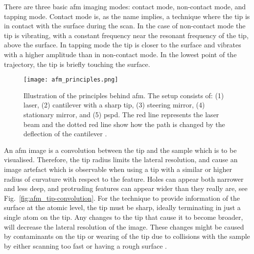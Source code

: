


There are three basic \ac{afm} imaging modes: contact mode, non-contact mode, and tapping mode. Contact mode is, as the name implies, a technique where the tip is in contact with the surface during the scan. In the case of non-contact mode the tip is vibrating, with a constant frequency near the resonant frequency of the tip, above the surface. In tapping mode the tip is closer to the surface and vibrates with a higher amplitude than in non-contact mode. In the lowest point of the trajectory, the tip is briefly touching the surface.

\begin{figure}[htbp]
    \centering
    \texttt{[image: afm\_principles.png]}
    \caption[Illustration of the principles behind \ac{afm}.]{Illustration of the principles behind \ac{afm}. The setup consists of: (1) laser, (2) cantilever with a sharp tip, (3) steering mirror, (4) stationary mirror, and (5) \acf{pspd}. The red line represents the laser beam and the dotted red line show how the path is changed by the deflection of the cantilever \citep[Adapted from][]{psia2002xe100}.}
    \label{fig:afm_laser}
\end{figure}

An \ac{afm} image is a convolution between the tip and the sample which is to be visualised. Therefore, the tip radius limits the lateral resolution, and cause an image artefact which is observable when using a tip with a similar or higher radius of curvature with respect to the feature. Holes can appear both narrower and less deep, and protruding features can appear wider than they really are, see Fig.~\ref{fig:afm_tip-convolution}. For the technique to provide information of the surface at the atomic level, the tip must be sharp, ideally terminating in just a single atom on the tip. Any changes to the tip that cause it to become broader, will decrease the lateral resolution of the image. These changes might be caused by contaminants on the tip or wearing of the tip due to collisions with the sample by either scanning too fast or having a rough surface \citep{birdi2003scanning}.

